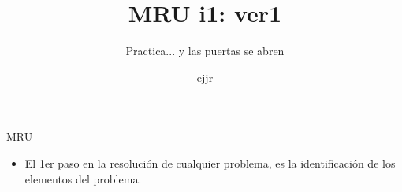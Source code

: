 \documentclass[%
final,
total,
slideBW,
colorBG,
pdf,
accumulate,
]{prosper}
\title{MRU i1: ver1}
\subtitle{Practica... y las puertas se abren}
\author{ejjr}
\begin{document}
\maketitle



\begin{slide}{MRU}
% 
 


 
\begin{itemize}                                                              

\item El 1er paso en la resoluci\'on de cualquier problema, es la
identificaci\'on de los elementos del problema.            
              
\end{itemize}

\end{slide}
\end{document}

